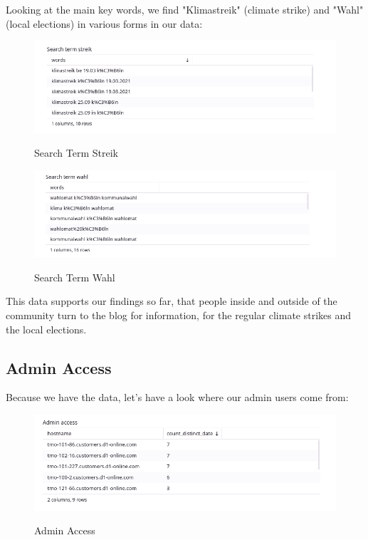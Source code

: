 Looking at the main key words, we find "Klimastreik" (climate strike) and "Wahl" (local elections) in various forms in our data:

\begin{figure}[H]
\centering
\caption {Search Term Streik}
\includegraphics[width=\linewidth]{images/figure04.png}
\label{fig:searchStreik}
\end{figure}

\begin{figure}[H]
\centering
\caption {Search Term Wahl}
\includegraphics[width=\linewidth]{images/figure05.png}
\label{fig:searchWahl}
\end{figure}

This data supports our findings so far, that people inside and outside of the community turn to the blog for information, for the regular climate strikes and the local elections.

\subsection{Admin Access}

Because we have the data, let's have a look where our admin users come from:

\begin{figure}[H]
\centering
\caption {Admin Access}
\includegraphics[width=\linewidth]{images/figure06.png}
\label{fig:adminAccess}
\end{figure}

